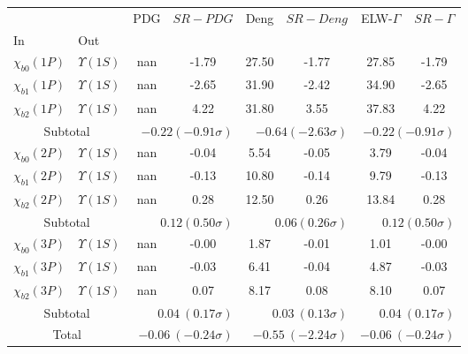 \begin{tabular}{|l|l|c|c|c|c|c|c|}%
\hline%
&&PDG&$SR-PDG$&Deng&$SR-Deng$&ELW-$\Gamma$&$SR-\Gamma$\\%
In&Out&&&&&&\\%
\hline%
$\chi_{b0}(1P)$&$\Upsilon(1S)$&nan&-1.79&27.50&-1.77&27.85&-1.79\\%
$\chi_{b1}(1P)$&$\Upsilon(1S)$&nan&-2.65&31.90&-2.42&34.90&-2.65\\%
$\chi_{b2}(1P)$&$\Upsilon(1S)$&nan&4.22&31.80&3.55&37.83&4.22\\%
\hline%
\hline%
\multicolumn{2}{|c|}{Subtotal}&\multicolumn{2}{|r|}{$-0.22 (-0.91\sigma)$}&\multicolumn{2}{|r|}{$-0.64 (-2.63\sigma)$}&\multicolumn{2}{|r|}{$-0.22 (-0.91\sigma)$}\\%
\hline%
\hline%
$\chi_{b0}(2P)$&$\Upsilon(1S)$&nan&-0.04&5.54&-0.05&3.79&-0.04\\%
$\chi_{b1}(2P)$&$\Upsilon(1S)$&nan&-0.13&10.80&-0.14&9.79&-0.13\\%
$\chi_{b2}(2P)$&$\Upsilon(1S)$&nan&0.28&12.50&0.26&13.84&0.28\\%
\hline%
\hline%
\multicolumn{2}{|c|}{Subtotal}&\multicolumn{2}{|r|}{$0.12 (0.50\sigma)$}&\multicolumn{2}{|r|}{$0.06 (0.26\sigma)$}&\multicolumn{2}{|r|}{$0.12 (0.50\sigma)$}\\%
\hline%
\hline%
$\chi_{b0}(3P)$&$\Upsilon(1S)$&nan&-0.00&1.87&-0.01&1.01&-0.00\\%
$\chi_{b1}(3P)$&$\Upsilon(1S)$&nan&-0.03&6.41&-0.04&4.87&-0.03\\%
$\chi_{b2}(3P)$&$\Upsilon(1S)$&nan&0.07&8.17&0.08&8.10&0.07\\%
\hline%
\hline%
\multicolumn{2}{|c|}{Subtotal}&\multicolumn{2}{|r|}{$0.04~(0.17\sigma)$}&\multicolumn{2}{|r|}{$0.03~(0.13\sigma)$}&\multicolumn{2}{|r|}{$0.04~(0.17\sigma)$}\\%
\hline%
\hline%
\multicolumn{2}{|c|}{Total}&\multicolumn{2}{|r|}{$-0.06~(-0.24\sigma)$}&\multicolumn{2}{|r|}{$-0.55~(-2.24\sigma)$}&\multicolumn{2}{|r|}{$-0.06~(-0.24\sigma)$}\\%
\hline%
\end{tabular}